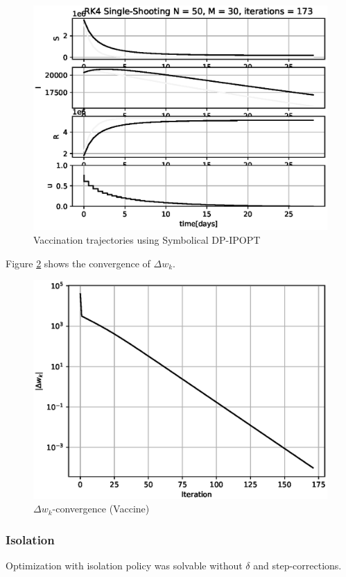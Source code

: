 \begin{figure}[H]
    \centering
    \includegraphics[width=.8\textwidth]{pythonProject/Figures/Symbolic_IPOPT_Traj_Vaccination.eps}
    \caption{Vaccination trajectories using Symbolical DP-IPOPT}
    \label{fig:Symbolical_DPIPOPT_traj_Vaccine}
\end{figure}
Figure \ref{fig:Delta_wk_convergence_Vaccine} shows the convergence of $\Delta w_k$.

\begin{figure}[H]
    \centering
    \includegraphics[width=.8\textwidth]{pythonProject/Figures/Symbolic_IPOPT_error_Vaccination.eps}
    \caption{$\Delta w_k$-convergence (Vaccine)}
    \label{fig:Delta_wk_convergence_Vaccine}
\end{figure}

\subsubsection{Isolation}

Optimization with isolation policy was solvable without $\delta$ and step-corrections.

